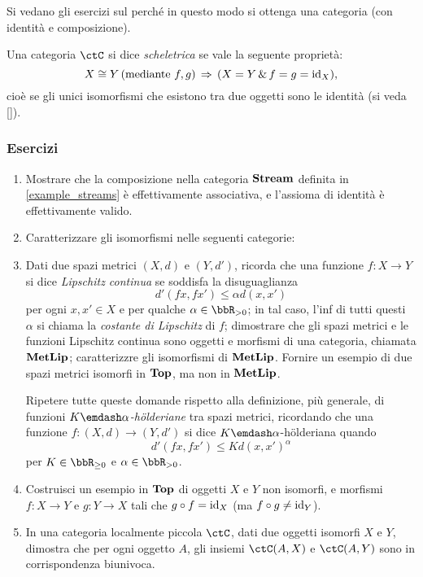 Si vedano gli esercizi sul perché in questo modo si ottenga una categoria (con identità e composizione).

\begin{definition}\label{def_cat_scheletrica}
	Una categoria \(\ctC\) si dice \emph{scheletrica} se vale la seguente proprietà:
	\[X\cong Y \, (\text{mediante } f,g) \,\Rightarrow\, (X=Y \,\&\, f=g=\mathrm{id}_X),\]
	cioè se gli unici isomorfismi che esistono tra due oggetti sono le identità (si veda \ref{}).
\end{definition}
\subsubsection*{Esercizi}
\begin{enumerate}
	\item Mostrare che la composizione nella categoria \(\mathbf{Stream}\) definita in \ref{example_streams} è effettivamente associativa, e l'assioma di identità è effettivamente valido. %
	\item Caratterizzare gli isomorfismi nelle seguenti categorie: 
	\item Dati due spazi metrici \((X,d)\) e \((Y,d')\), ricorda che una funzione \(f:X\to Y\) si dice \emph{Lipschitz continua} se soddisfa la disuguaglianza
	      \[
		      d'(fx,fx')\le \alpha d(x,x')
	      \]
	      per ogni \(x,x'\in X\) e per qualche \(\alpha\in\bbR_{>0}\); in tal caso, l'inf di tutti questi \(\alpha\) si chiama la \emph{costante di Lipschitz} di \(f\); dimostrare che gli spazi metrici e le funzioni Lipschitz continua sono oggetti e morfismi di una categoria, chiamata \(\mathbf{MetLip}\); caratterizzre gli isomorfismi di \(\mathbf{MetLip}\). Fornire un esempio di due spazi metrici isomorfi in \(\mathbf{Top}\), ma non in \(\mathbf{MetLip}\).

	      Ripetere tutte queste domande rispetto alla definizione, più generale, di funzioni \emph{\(K\emdash\alpha\)-h\"olderiane} tra spazi metrici, ricordando che una funzione \(f : (X,d)\to (Y,d')\) si dice \(K\emdash\alpha\)-h\"olderiana quando
	      \[d'(fx,fx')\le Kd(x,x')^\alpha\]
	      per \(K\in \bbR_{\ge 0}\) e \(\alpha\in \bbR_{>0}\).
	\item Costruisci un esempio in \(\mathbf{Top}\) di oggetti \(X\) e \(Y\) non isomorfi, e morfismi \(f:X\to Y\) e \(g:Y\to X\) tali che \(g\circ f=\mathrm{id}_X\) (ma \(f\circ g \ne \mathrm{id}_Y\)).
	\item In una categoria localmente piccola \(\ctC\), dati due oggetti isomorfi \(X\) e \(Y\), dimostra che per ogni oggetto \(A\), gli insiemi \(\Hom{\ctC}(A,X)\) e \(\Hom{\ctC}(A,Y)\) sono in corrispondenza biunivoca.
\end{enumerate}
